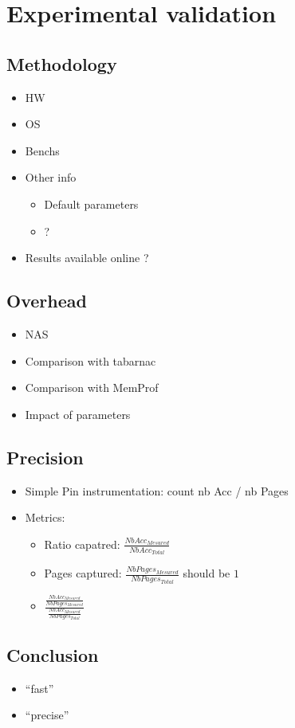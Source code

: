 \section{Experimental validation}
\label{sec:expe}

\subsection{Methodology}
\label{sec:exp-methodo}

\begin{itemize}
    \item HW
    \item OS
    \item Benchs
    \item Other info
        \begin{itemize}
            \item Default parameters
            \item  ?
        \end{itemize}
    \item Results available online ?
\end{itemize}

\subsection{Overhead}
\label{sec:expe-ovh}

\begin{itemize}
    \item NAS
    \item Comparison with tabarnac
    \item Comparison with MemProf
    \item Impact of parameters
\end{itemize}

\subsection{Precision}
\label{sec:expe-precision}

\begin{itemize}
    \item Simple Pin instrumentation: count nb Acc / nb Pages
    \item Metrics:
        \begin{itemize}
            \item Ratio capatred: $\frac{NbAcc_{Mesured}}{NbAcc_{Total}}$
            \item Pages captured: $\frac{NbPages_{Mesured}}{NbPages_{Total}}$
                should be $1$
            \item
                $\frac{\frac{NbAcc_{Mesured}}{NbPages_{Mesured}}}{\frac{NbAcc_{Mesured}}{NbPages_{Total}}}$
        \end{itemize}
\end{itemize}

\subsection{Conclusion}
\label{sec:expe-cncl}

\begin{itemize}
    \item ``fast''
    \item ``precise''
\end{itemize}
